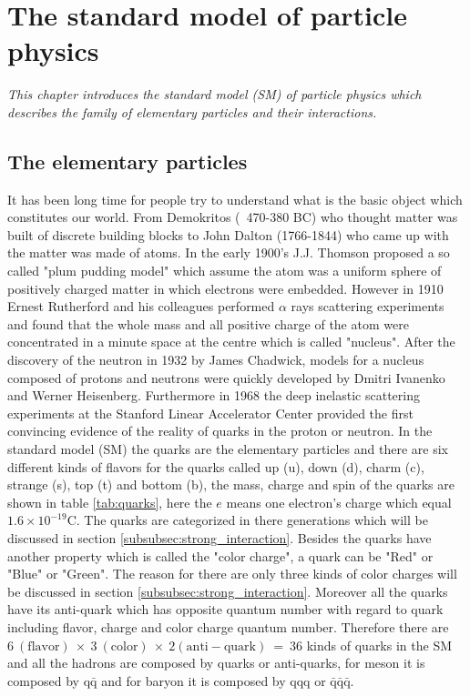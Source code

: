 
\chapter{The standard model of particle physics}\label{sec:SM}
\textit{This chapter introduces the standard model (SM) of particle physics which describes the family of elementary particles and their interactions.}
\section{The elementary particles}\label{subsec:elem_particle}
It has been long time for people try to understand what is the basic object which constitutes our world. From Demokritos (~470-380 BC) who thought matter was built of discrete building blocks to John Dalton (1766-1844) who came up with the matter was made of atoms. In the early 1900's J.J. Thomson proposed a so called "plum pudding model" which assume the atom was a uniform sphere of positively charged matter in which electrons were embedded. However in 1910 Ernest Rutherford and his colleagues performed $\alpha$ rays scattering experiments and found that the whole mass and all positive charge of the atom were concentrated in a minute space at the centre which is called "nucleus". After the discovery of the neutron in 1932 by James Chadwick, models for a nucleus composed of protons and neutrons were quickly developed by Dmitri Ivanenko and Werner Heisenberg. Furthermore in 1968 the deep inelastic scattering experiments at the Stanford Linear Accelerator Center provided the first convincing evidence of the reality of quarks in the proton or neutron. In the standard model (SM) the quarks are the elementary particles and there are six different kinds of flavors for the quarks called up (u), down (d), charm (c), strange (s), top (t) and bottom (b), the mass, charge and spin of the quarks are shown in table \ref{tab:quarks}, here the $e$ means one electron's charge which equal $\mathrm{1.6\times10^{-19}C}$. The quarks are categorized in there generations which will be discussed in section \ref{subsubsec:strong_interaction}. Besides the quarks have another property which is called the "color charge", a quark can be "Red" or "Blue" or "Green". The reason for there are only three kinds of color charges will be discussed in section \ref{subsubsec:strong_interaction}. Moreover all the quarks have its anti-quark which has opposite quantum number with regard to quark including flavor, charge and color charge quantum number. Therefore there are $\mathrm{6~(flavor)~\times~3~(color)~\times~2(anti-quark)~=~36}$ kinds of quarks in the SM and all the hadrons are composed by quarks or anti-quarks, for meson it is composed by $\mathrm{q\bar{q}}$ and for baryon it is composed by $\mathrm{qqq}$ or $\mathrm{\bar{q}\bar{q}\bar{q}}$.
